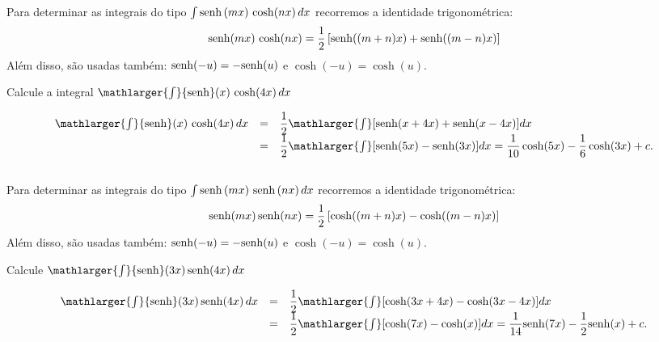 \cleardoublepage\documentclass[../main.tex]{subfiles}
\begin{document}
\subsection[\formula{Integrais do tipo $\int \senh(mx)\,\cosh(nx)\,dx$}]{}
Para determinar as integrais do tipo $\int \senh(mx)\,\cosh(nx)\,dx$ recorremos a identidade trigonométrica:
\begin{equation}
    {\rm senh}(mx)\,\cosh(nx)= \dfrac{1}{2}\left[ {\rm senh}((m+n)x) +{\rm senh}((m-n)x)\right]
\end{equation}
Além disso, são usadas também: \({\rm senh}(-u)=-{\rm senh}(u)\) e \(\cosh(-u)=\cosh(u)\).
\begin{ex}
Calcule a integral \(\mathlarger{\int} {\rm senh}(x)\,\cosh (4x)\,dx\)

\begin{solution}
\[ \begin{array}{rcl} \mathlarger{\int} {\rm senh}(x)\,\cosh( 4x)\,dx& =& \dfrac{1}{2}\mathlarger{\int}[ {\rm senh}(x+4x) + {\rm senh}(x-4x) ]dx\\ &=&\dfrac{1}{2}\mathlarger{\int}[ {\rm senh}(5x) -{\rm senh}(3x) ]dx = \dfrac{1}{10}\cosh( 5x) - \dfrac{1}{6}\cosh( 3x) +c. \end{array} \]
\end{solution}
\end{ex}
\subsection[\formula{Integrais do tipo $\int  \senh(mx)\,\senh(nx)\,dx$}]{}
Para determinar as integrais do tipo $\int  \senh(mx)\,\senh(nx)\,dx$ recorremos a identidade trigonométrica:
\begin{equation}
   {\rm senh}(mx)\,{\rm senh}(nx)= \dfrac{1}{2}\left[ \cosh((m+n)x) -\cosh((m-n)x)\right]
\end{equation}
Além disso, são usadas também: \({\rm senh}(-u)=-{\rm senh}(u)\) e \(\cosh(-u)=\cosh(u)\).

\begin{ex}
Calcule \(\mathlarger{\int} {\rm senh}(3x)\,{\rm senh}(4x)\,dx\)

\begin{solution}
\[ \begin{array}{rcl} \mathlarger{\int} {\rm senh}(3x)\,{\rm senh}(4x)\,dx &=& \dfrac{1}{2}\mathlarger{\int}[\cosh(3x+4x) - \cosh(3x-4x)]dx \\ &=&\dfrac{1}{2}\mathlarger{\int}[\cosh(7x) - \cosh(x)]dx = \dfrac{1}{14}{\rm senh}(7x)- \dfrac{1}{2}{\rm senh}(x) +c. \end{array} \]
\end{solution}
\end{ex}
\end{document}
